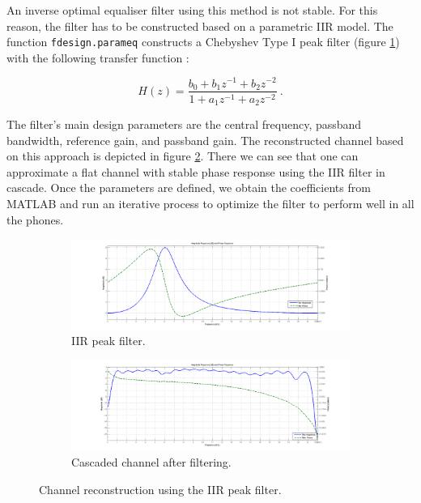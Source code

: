 \documentclass[12pt,a4paper,openright]{report}
\begin{document}
An inverse optimal equaliser filter using this method is not stable. For this reason, the filter has to be constructed based on a parametric IIR model. The function \texttt{fdesign.parameq} constructs a Chebyshev Type I peak filter (figure \ref{fig:IIRpeak}) with the following transfer function \cite{MATLABparameq}:

\begin{equation}
H\left( z \right) = \frac{{{b_0} + {b_1}{z^{ - 1}} + {b_2}{z^{ - 2}}}}{{1 + {a_1}{z^{ - 1}} + {a_2}{z^{ - 2}}}}\ .
\end{equation}

The filter's main design parameters are the central frequency, passband bandwidth, reference gain, and passband gain. The reconstructed channel based on this approach is depicted in figure \ref{fig:cascadefilter}. There we can see that one can approximate a flat channel with stable phase response using the IIR filter in cascade. Once the parameters are defined, we obtain the coefficients from MATLAB and run an iterative process to optimize the filter to perform well in all the phones.

\begin{figure}[H]
\centering
\begin{subfigure}[H]{.8\textwidth}
  \centering
  \includegraphics[width=1\linewidth]{peakFilter.png}
  \caption{IIR peak filter.}
  \label{fig:IIRpeak}
  \quad
\end{subfigure}%
\quad
\begin{subfigure}[H]{.8\textwidth}
  \centering
  \includegraphics[width=1\linewidth]{reconstChan.png}
  \caption{Cascaded channel after filtering.}
  \label{fig:cascadefilter}
\end{subfigure}
\caption[Channel reconstruction using the IIR peak filter]{Channel reconstruction using the IIR peak filter.}
   \label{fig:chanReconstruction}
    \end{figure}
\end{document}
